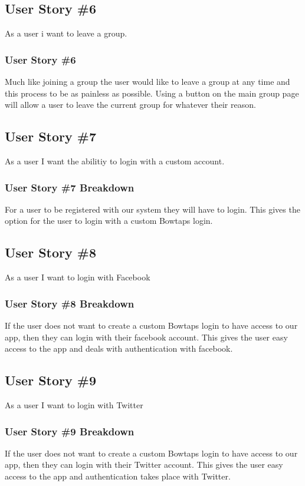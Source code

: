 \subsection{User Story \#6} 
As a user i want to leave a group.

\subsubsection{User Story \#6}
Much like joining a group the user would like to leave a group at any time and this process to be as painless as possible.  Using a button on the main group page will allow a user to leave the current group for whatever their reason.

\subsection{User Story \#7} 
As a user I want the abilitiy to login with a custom account.

\subsubsection{User Story \#7 Breakdown}
For a user to be registered with our system they will have to login.  This gives the option for the user to login with a custom Bowtaps login.

\subsection{User Story \#8}
As a user I want to login with Facebook

\subsubsection{User Story \#8 Breakdown}
If the user does not want to create a custom Bowtaps login to have access to our app,  then they can login with their facebook account.  This gives the user easy access to the app and deals with authentication with facebook.

\subsection{User Story \#9}
As a user I want to login with Twitter
\subsubsection{User Story \#9 Breakdown}
If the user does not want to create a custom Bowtaps login to have access to our app, then they can login with their Twitter account.  This gives the user easy access to the app and authentication takes place with Twitter.
